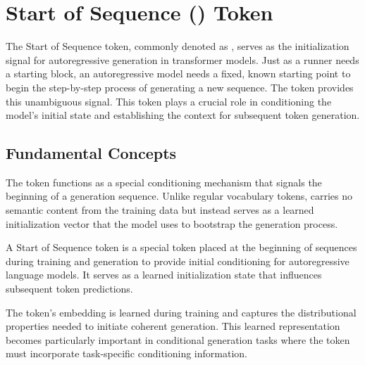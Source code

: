 
\section{Start of Sequence (\sos{}) Token}

The Start of Sequence token, commonly denoted as \sos{}, serves as the initialization signal for autoregressive generation in transformer models. Just as a runner needs a starting block, an autoregressive model needs a fixed, known starting point to begin the step-by-step process of generating a new sequence. The \sos{} token provides this unambiguous signal. This token plays a crucial role in conditioning the model's initial state and establishing the context for subsequent token generation.

\subsection{Fundamental Concepts}

The \sos{} token functions as a special conditioning mechanism that signals the beginning of a generation sequence. Unlike regular vocabulary tokens, \sos{} carries no semantic content from the training data but instead serves as a learned initialization vector that the model uses to bootstrap the generation process.

\begin{definition}
A Start of Sequence token \sos{} is a special token placed at the beginning of sequences during training and generation to provide initial conditioning for autoregressive language models. It serves as a learned initialization state that influences subsequent token predictions.
\end{definition}

The \sos{} token's embedding is learned during training and captures the distributional properties needed to initiate coherent generation. This learned representation becomes particularly important in conditional generation tasks where the \sos{} token must incorporate task-specific conditioning information.

